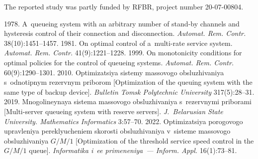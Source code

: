    
  
   

\vspace*{-16pt}

 \Ack
 
 \vspace*{-2pt}
 
   \noindent
   The reported study was partly funded by RFBR, project number 20-07-00804.



  \begin{multicols}{2}

\renewcommand{\bibname}{\protect\rmfamily References}

{\small\frenchspacing
 {%
 \begin{thebibliography}{99}
   1978. A~queueing 
system with an arbitrary number of stand-by channels and hysteresis control of their connection and 
disconnection. \textit{Automat. Rem. Contr.} 38(10):1451--1457.
   1981. On optimal control of a~multi-rate service system. \textit{Automat. Rem. Contr.} 41(9):1221--1228.
   1999. On monotonicity conditions for optimal policies for the control of queueing 
systems. \textit{Automat. Rem. Contr.} 60(9):1290--1301.
   2010. Op\-ti\-mi\-za\-tsiya sis\-te\-my mas\-so\-vo\-go ob\-slu\-zhi\-va\-niya 
  s~odnotipnym re\-zerv\-nym pri\-bo\-rom [Optimization of the queuing system with the same type of backup device]. 
\textit{Bulletin Tomsk Polytechnic University} 317(5):28--31.
   2019. Mnogolineynaya sis\-te\-ma mas\-so\-vo\-go ob\-slu\-zhi\-va\-niya s~re\-zerv\-ny\-mi pri\-bo\-ra\-mi 
[Multi-server queueing system with reserve servers]. \textit{J.~Belarusian State University. Mathematics Informatics} 3:57--70.
   2022. Op\-ti\-mi\-za\-tsiya po\-ro\-go\-vo\-go uprav\-le\-niya pe\-re\-klyu\-che\-ni\-em sko\-rosti 
ob\-slu\-zhi\-va\-niya v~sis\-te\-me massovogo ob\-slu\-zhi\-va\-niya $G/M/1$ [Optimization of the threshold service speed 
control in the $G/M/1$ queue]. \textit{Informatika i~ee primeneniya~--- Inform. Appl.} 16(1):73--81.


\end{thebibliography}}}
\end{multicols}
